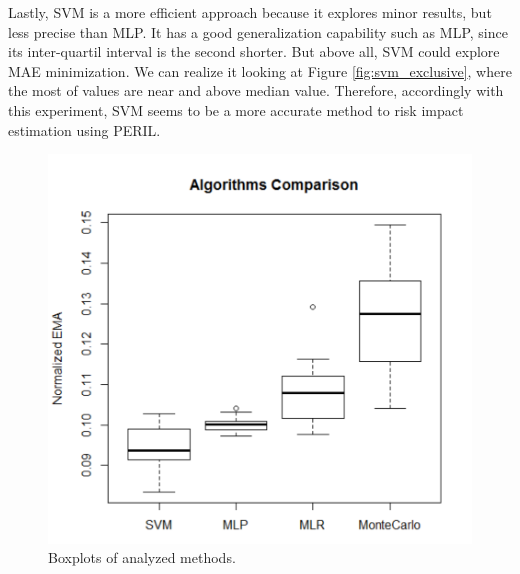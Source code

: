 \documentclass[a4paper,twoside]{article}
\begin{document}
Lastly, SVM is a more efficient approach because it explores minor results, but less precise than MLP. It has a good generalization capability such as MLP, since its inter-quartil interval is the second shorter. But above all, SVM could explore MAE minimization. We can realize it looking at Figure \ref{fig:svm_exclusive}, where the most of values are near and above median value. Therefore, accordingly with this experiment, SVM seems to be a more accurate method to risk impact estimation using PERIL.

\begin{figure}[!h]
  \vspace{-0.2cm}
  \centering
  \includegraphics[width=\columnwidth]{images/resul_final.pdf}
  \caption{Boxplots of analyzed methods.}
  \label{fig:final_result}
\end{figure}
\end{document}
